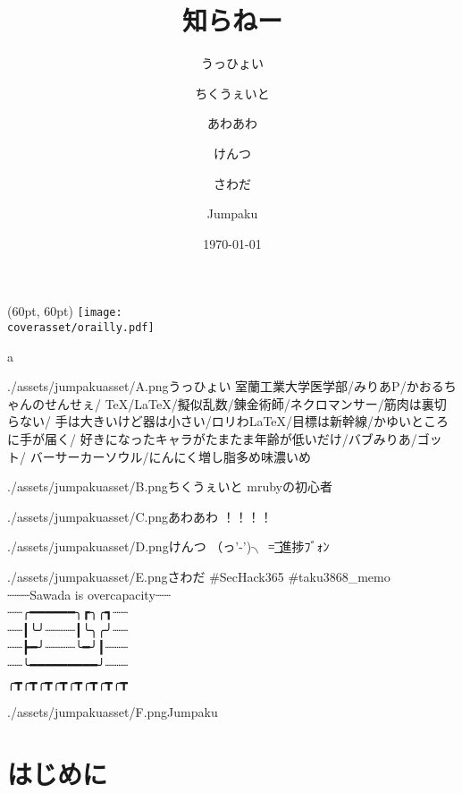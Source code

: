 \documentclass[autodetect-engine,dvipdfmx-if-dvi,ja=standard,a5paper,12pt,twoside,openany,layout=v2,tombow]{bxjsbook}
\title{知らねー}
\author{うっひょい \and ちくうぇいと \and あわあわ \and けんつ \and さわだ \and Jumpaku}
\date{\today}
\newcommand{\articlepath}{./articles}
\newcommand{\assetspath}{./assets}
\newcommand{\coverasset}{\assetspath/coverasset}
\newcommand{\jumpakuasset}{\assetspath/jumpakuasset}
\begin{document}
\begin{titlepage}
  \begin{textblock*}{\hsize}(60pt, 60pt)
    \centering
    \texttt{[image: \\coverasset/orailly.pdf]}
  \end{textblock*}
  a
\end{titlepage}
\maketitle
\frontmatter

\begin{myintroduce}{\jumpakuasset/A.png}{うっひょい}
  室蘭工業大学医学部/みりあP/かおるちゃんのせんせぇ/
  TeX/LaTeX/擬似乱数/錬金術師/ネクロマンサー/筋肉は裏切らない/
  手は大きいけど器は小さい/ロリわLaTeX/目標は新幹線/かゆいところに手が届く/
  好きになったキャラがたまたま年齢が低いだけ/バブみりあ/ゴット/
  バーサーカーソウル/にんにく増し脂多め味濃いめ
\end{myintroduce}
\begin{myintroduce}{\jumpakuasset/B.png}{ちくうぇいと}
  mrubyの初心者
\end{myintroduce}
\begin{myintroduce}{\jumpakuasset/C.png}{あわあわ}
  ！！！！
\end{myintroduce}
\begin{myintroduce}{\jumpakuasset/D.png}{けんつ}
  （っ'-')╮ =͟͟͞͞ 進捗ﾌﾞｫﾝ
\end{myintroduce}
\begin{myintroduce}{\jumpakuasset/E.png}{さわだ}
  \#SecHack365 \#taku3868\_memo \\┈┈┈Sawada is overcapacity┈┈ \\
   ┈┈╭━━━━━━╮┏╮╭┓┈┈ \\
   ┈┈┃╰╯┈┈┈┈┃╰╮╭╯┈┈ \\
   ┈┈┣━╯┈┈┈┈╰━╯┃┈┈┈ \\
   ┈┈╰━━━━━━━━━╯┈┈┈ \\
   ╭┳╭┳╭┳╭┳╭┳╭┳╭┳╭┳
\end{myintroduce}
\begin{myintroduce}{\jumpakuasset/F.png}{Jumpaku}

\end{myintroduce}

\chapter{はじめに}


\tableofcontents
\mainmatter
{}
\end{document}
